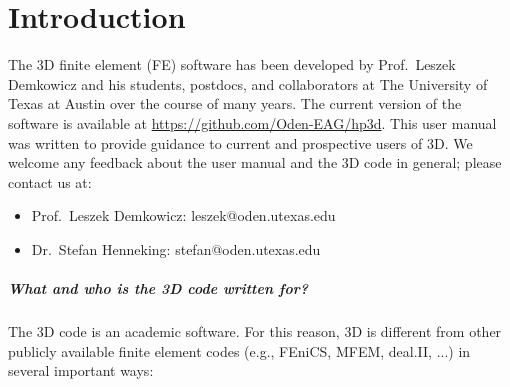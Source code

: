 %
%

\chapter{Introduction}
\label{chap:introduction}



The \hp3D finite element (FE) software has been developed by Prof.~Leszek Demkowicz and his students, postdocs, and collaborators at The University of Texas at Austin over the course of many years. The current version of the software is available at \url{https://github.com/Oden-EAG/hp3d}. This user manual was written to provide guidance to current and prospective users of \hp3D. We welcome any feedback about the user manual and the \hp3D code in general; please contact us at:
\begin{itemize}
	\item Prof.~Leszek Demkowicz: leszek@oden.utexas.edu
	\item Dr.~Stefan Henneking: stefan@oden.utexas.edu
\end{itemize}

\paragraph{What and who is the \hp3D code written for?}
The \hp3D code is an academic software. For this reason, \hp3D is different from other publicly available finite element codes (e.g., FEniCS, MFEM, deal.II, ...) in several important ways:

